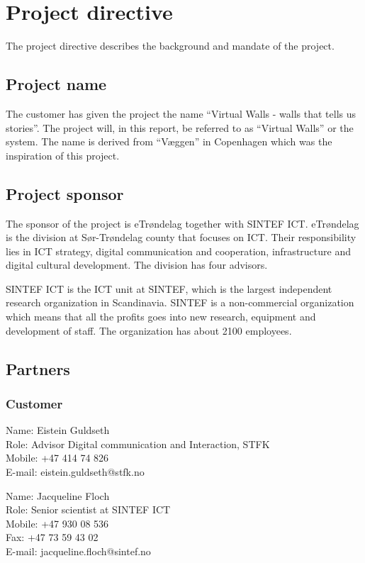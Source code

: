 \documentclass[11pt]{book}
\begin{document}
\section{Project directive}
The project directive describes the background and mandate of the project.

\subsection{Project name}
The customer has given the project the name ``Virtual Walls - walls that tells us stories''. The project will, in this report, be referred to as ``Virtual Walls'' or the system. The name is derived from ``Væggen'' in Copenhagen which was the inspiration of this project.

\subsection{Project sponsor}
The sponsor of the project is eTrøndelag together with SINTEF ICT.
eTrøndelag is the division at Sør-Trøndelag county that focuses on ICT. Their responsibility lies in ICT strategy, digital communication and cooperation, infrastructure and digital cultural development. The division has four advisors.

SINTEF ICT is the ICT unit at SINTEF, which is the largest independent research organization in Scandinavia. SINTEF is a non-commercial organization which means that all the profits goes into new research, equipment and development of staff. The organization has about 2100 employees.

\subsection{Partners}
\subsubsection{Customer}
Name: Eistein Guldseth\\
Role: Advisor Digital communication and Interaction, STFK\\
Mobile: +47 414 74 826\\
E-mail: eistein.guldseth@stfk.no

Name: Jacqueline Floch\\
Role: Senior scientist at SINTEF ICT\\
Mobile: +47 930 08 536\\
Fax: +47 73 59 43 02\\
E-mail: jacqueline.floch@sintef.no
\end{document}
